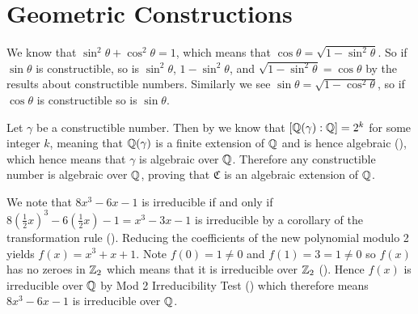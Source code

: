 \section{Geometric Constructions}
\begin{questions}
    \item We know that $\sin^2\theta + \cos^2\theta = 1$, which means that $\cos\theta = \sqrt{1-\sin^2\theta}$. So if $\sin\theta$ is constructible, so is $\sin^2\theta$, $1 - \sin^2\theta$, and $\sqrt{1-\sin^2\theta} = \cos\theta$ by the results about constructible numbers. Similarly we see $\sin\theta = \sqrt{1-\cos^2\theta}$, so if $\cos\theta$ is constructible so is $\sin\theta$.
    
    \item Let $\gamma$ be a constructible number. Then by  we know that $[\mathbb{Q}(\gamma):\mathbb{Q}] = 2^k$ for some integer $k$, meaning that $\mathbb{Q}(\gamma)$ is a finite extension of $\mathbb{Q}$ and is hence algebraic (), which hence means that $\gamma$ is algebraic over $\mathbb{Q}$. Therefore any constructible number is algebraic over $\mathbb{Q}$, proving that $\mathfrak{C}$ is an algebraic extension of $\mathbb{Q}$.

    \item We note that $8x^3 - 6x - 1$ is irreducible if and only if $8\left(\frac12x\right)^3 - 6\left(\frac12x\right) - 1 = x^3 - 3x - 1$ is irreducible by a corollary of the transformation rule (). Reducing the coefficients of the new polynomial modulo 2 yields $f(x) = x^3 + x + 1$. Note $f(0) = 1 \neq 0$ and $f(1) = 3 = 1 \neq 0$ so $f(x)$ has no zeroes in $\mathbb{Z}_2$ which means that it is irreducible over $\mathbb{Z}_2$ (). Hence $f(x)$ is irreducible over $\mathbb{Q}$ by Mod 2 Irreducibility Test () which therefore means $8x^3 - 6x - 1$ is irreducible over $\mathbb{Q}$.
\end{questions}
